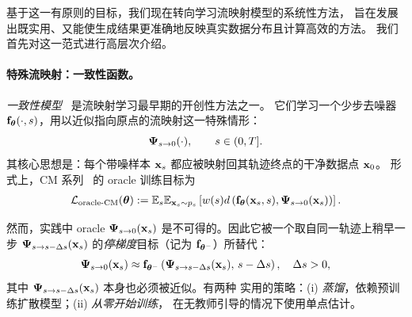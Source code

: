 基于这一有原则的目标，我们现在转向学习流映射模型的系统性方法，
旨在发展出既实用、又能使生成结果更准确地反映真实数据分布且计算高效的方法。
我们首先对这一范式进行高层次介绍。
\paragraph{特殊流映射：一致性函数。}
\emph{一致性模型}~\citep{song2023consistency} 是流映射学习最早期的开创性方法之一。
它们学习一个少步去噪器 ${\mathbf{f}}_{\bm{\theta}}(\cdot,s)$，用以近似指向原点的流映射这一特殊情形：
\[
{\bm{\Psi}}_{s\to 0}(\cdot), \qquad s \in (0,T].
\]
其核心思想是：每个带噪样本 ${\mathbf{x}}_s$ 都应被映射回其轨迹终点的干净数据点 ${\mathbf{x}}_0$。
形式上，CM 系列~\citep{song2023consistency,songimproved,geng2024consistency,lu2024simplifying} 的 oracle 训练目标为
\begin{align}\label{eq:oracle-cm}
    \mathcal{L}_{\mathrm{oracle}\text{-}\mathrm{CM}}({\bm{\theta}}) 
    := \mathbb{E}_{s} \mathbb{E}_{{\mathbf{x}}_s\sim p_s} \left[ w(s)  d \left({\mathbf{f}}_{\bm{\theta}}({\mathbf{x}}_s,s), {\bm{\Psi}}_{s\to 0}({\mathbf{x}}_s)\right)\right].
\end{align}




然而，实践中 oracle ${\bm{\Psi}}_{s\to 0}({\mathbf{x}}_s)$ 是不可得的。因此它被一个取自同一轨迹上稍早一步 ${\bm{\Psi}}_{s\to s-\Delta s}({\mathbf{x}}_s)$ 的\emph{停梯度}目标（记为 ${\mathbf{f}}_{{\bm{\theta}}^-}$）所替代：
\[
{\bm{\Psi}}_{s\to 0}({\mathbf{x}}_s) \approx {\mathbf{f}}_{{\bm{\theta}}^-} \left({\bm{\Psi}}_{s\to s-\Delta s}({\mathbf{x}}_s),\,s-\Delta s\right), \quad \Delta s > 0,
\]
其中 ${\bm{\Psi}}_{s\to s-\Delta s}({\mathbf{x}}_s)$ 本身也必须被近似。有两种
实用的策略：(i) \emph{蒸馏}，依赖预训练扩散模型；(ii) \emph{从零开始训练}，
在无教师引导的情况下使用单点估计。



